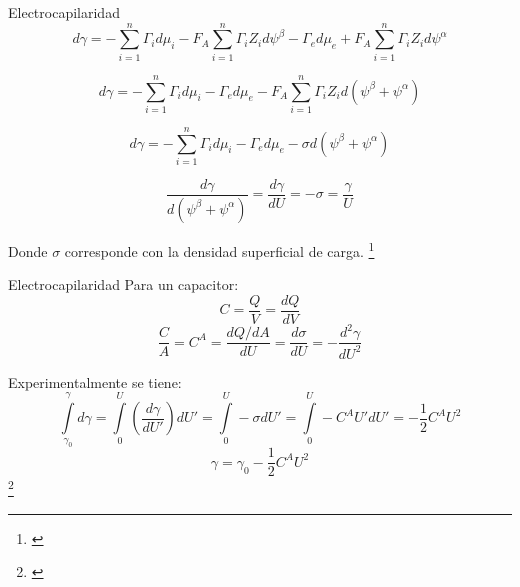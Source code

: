 \documentclass[handout]{beamer}
\newcommand\blfootnote[1]
{%
	\begingroup
	\renewcommand\thefootnote{}\footnote{#1}%
	\addtocounter{footnote}{-1}%
	\endgroup
}
\newcommand{\fcite}[1]{\blfootnote{\cite{#1}}}
\begin{document}
\begin{frame}{Electrocapilaridad}
	\small
	\begin{equation}
		d\gamma = -\sum\limits_{i=1}^n\Gamma_id\mu_i - F_A\sum\limits_{i=1}^n\Gamma_iZ_id\psi^\beta - \Gamma_ed\mu_e + F_A\sum\limits_{i=1}^n\Gamma_iZ_id\psi^\alpha
	\end{equation}
	
	\begin{equation}
		d\gamma = -\sum\limits_{i=1}^n\Gamma_id\mu_i - \Gamma_ed\mu_e - F_A\sum\limits_{i=1}^n\Gamma_iZ_id(\psi^\beta + \psi^\alpha)
	\end{equation}

	\begin{equation}
		d\gamma = -\sum\limits_{i=1}^n\Gamma_id\mu_i - \Gamma_ed\mu_e - \sigma d(\psi^\beta + \psi^\alpha)
	\end{equation}
	
	\begin{equation}
		\dfrac{d\gamma}{d(\psi^\beta + \psi^\alpha)} = \dfrac{d\gamma}{dU} = -\sigma = \dfrac{\gamma}{U}
	\end{equation}
	
	Donde $\sigma$ corresponde con la densidad superficial de carga.	
	\fcite{butt2006physics}
\end{frame}

\begin{frame}{Electrocapilaridad}
	\small
	Para un capacitor:
	\begin{equation}
		C = \dfrac{Q}{V} = \dfrac{dQ}{dV}
	\end{equation}
	\begin{equation}
		\dfrac{C}{A} = C^A = \dfrac{dQ/dA}{dU} = \dfrac{d\sigma}{dU} = -\dfrac{d^2\gamma}{dU^2}
	\end{equation}
	
	Experimentalmente se tiene:
	\begin{equation}
		\int\limits_{\gamma_0}^{\gamma}d\gamma = \int\limits_{0}^{U}\left(\dfrac{d\gamma}{dU'}\right)dU' = \int\limits_{0}^{U}-\sigma dU' = \int\limits_{0}^{U}-C^AU'dU' = -\dfrac{1}{2}C^AU^2 
	\end{equation}
	\begin{equation}
		\gamma = \gamma_0 - \dfrac{1}{2}C^AU^2
	\end{equation}
	\fcite{butt2006physics}
\end{frame}
\end{document}
